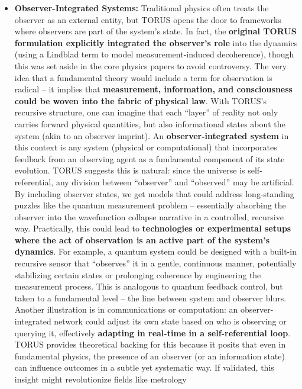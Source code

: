 \documentclass[]{article}
\begin{document}
\begin{itemize}
\item
  \textbf{Observer-Integrated Systems:} Traditional physics often treats
  the observer as an external entity, but TORUS opens the door to
  frameworks where observers are part of the system's state. In fact,
  the \textbf{original TORUS formulation explicitly integrated the
  observer's role} into the dynamics (using a Lindblad term to model
  measurement-induced decoherence), though this was set aside in the
  core physics papers to avoid controversy​. The very idea that a
  fundamental theory would include a term for observation is radical --
  it implies that \textbf{measurement, information, and consciousness
  could be woven into the fabric of physical law}. With TORUS's
  recursive structure, one can imagine that each ``layer'' of reality
  not only carries forward physical quantities, but also informational
  states about the system (akin to an observer imprint). An
  \textbf{observer-integrated system} in this context is any system
  (physical or computational) that incorporates feedback from an
  observing agent as a fundamental component of its state evolution.
  TORUS suggests this is natural: since the universe is
  self-referential, any division between ``observer'' and ``observed''
  may be artificial. By including observer states, we get models that
  could address long-standing puzzles like the quantum measurement
  problem -- essentially absorbing the observer into the wavefunction
  collapse narrative in a controlled, recursive way​. Practically, this
  could lead to \textbf{technologies or experimental setups where the
  act of observation is an active part of the system's dynamics}. For
  example, a quantum system could be designed with a built-in recursive
  sensor that ``observes'' it in a gentle, continuous manner,
  potentially stabilizing certain states or prolonging coherence by
  engineering the measurement process. This is analogous to quantum
  feedback control, but taken to a fundamental level -- the line between
  system and observer blurs. Another illustration is in communications
  or computation: an observer-integrated network could adjust its own
  state based on who is observing or querying it, effectively
  \textbf{adapting in real-time in a self-referential loop}. TORUS
  provides theoretical backing for this because it posits that even in
  fundamental physics, the presence of an observer (or an information
  state) can influence outcomes in a subtle yet systematic way. If
  validated, this insight might revolutionize fields like metrology

\end{itemize}
\end{document}
